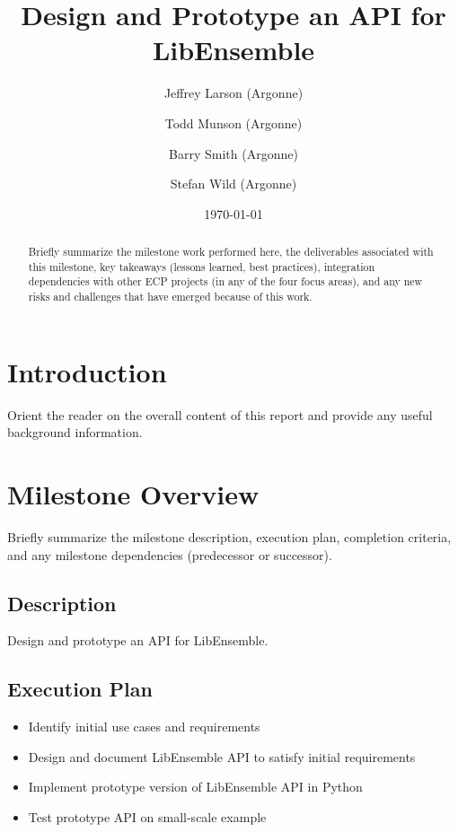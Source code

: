 \documentclass{ecpreport}
\title{Design and Prototype an API for LibEnsemble}
\author{Jeffrey Larson (Argonne)
  \and  Todd Munson (Argonne)
  \and  Barry Smith (Argonne)
  \and  Stefan Wild (Argonne)
}
\date{\today}
\begin{document}
\frontmatter


\begin{abstract}
Briefly summarize the milestone work performed here, the deliverables 
associated with this milestone, key takeaways (lessons learned, best 
practices), integration dependencies with other ECP projects (in any 
of the four focus areas), and any new risks and challenges that have 
emerged because of this work.
\end{abstract}


\mainmatter
\section{Introduction}

Orient the reader on the overall content of this report and provide any 
useful background information.

\section{Milestone Overview}

Briefly summarize the milestone description, execution plan, 
completion criteria, and any milestone dependencies (predecessor 
or successor). 

\subsection{Description}

Design and prototype an API for LibEnsemble.

\subsection{Execution Plan}

\begin{itemize}
\item Identify initial use cases and requirements
\item Design and document LibEnsemble API to satisfy initial requirements
\item Implement prototype version of LibEnsemble API in Python
\item Test prototype API on small-scale example
\end{itemize}
\end{document}

